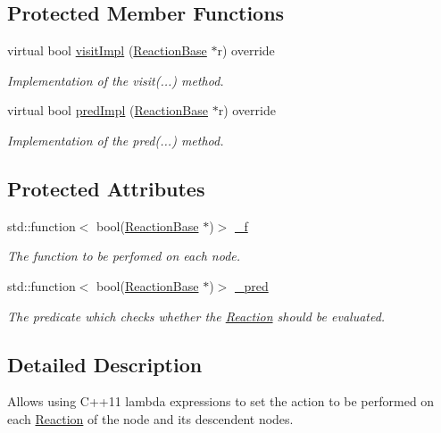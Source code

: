 \subsection*{Protected Member Functions}
\begin{DoxyCompactItemize}
\item 
virtual bool \hyperlink{classReactionVisitorLambda_aaadac898ea6650cd79774b14ac0b16d7}{visit\+Impl} (\hyperlink{classReactionBase}{Reaction\+Base} $\ast$r) override
\begin{DoxyCompactList}\small\item\em Implementation of the visit(...) method. \end{DoxyCompactList}\item 
virtual bool \hyperlink{classReactionVisitorLambda_af6f228e3a7e53ebe476f7cf9ff7cae33}{pred\+Impl} (\hyperlink{classReactionBase}{Reaction\+Base} $\ast$r) override
\begin{DoxyCompactList}\small\item\em Implementation of the pred(...) method. \end{DoxyCompactList}\end{DoxyCompactItemize}
\subsection*{Protected Attributes}
\begin{DoxyCompactItemize}
\item 
std\+::function$<$ bool(\hyperlink{classReactionBase}{Reaction\+Base} $\ast$)$>$ \hyperlink{classReactionVisitorLambda_a14552291fb7778f68e6d18b311f48dea}{\+\_\+f}
\begin{DoxyCompactList}\small\item\em The function to be perfomed on each node. \end{DoxyCompactList}\item 
std\+::function$<$ bool(\hyperlink{classReactionBase}{Reaction\+Base} $\ast$)$>$ \hyperlink{classReactionVisitorLambda_aa23e41358778181613f193ef325b5813}{\+\_\+pred}
\begin{DoxyCompactList}\small\item\em The predicate which checks whether the \hyperlink{classReaction}{Reaction} should be evaluated. \end{DoxyCompactList}\end{DoxyCompactItemize}


\subsection{Detailed Description}
Allows using C++11 lambda expressions to set the action to be performed on each \hyperlink{classReaction}{Reaction} of the node and its descendent nodes. 

